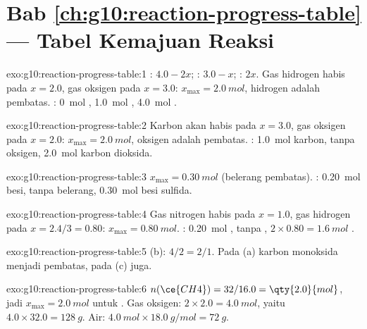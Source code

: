 \section*{Bab \ref{ch:g10:reaction-progress-table} --- Tabel Kemajuan Reaksi}

\begin{solution}{exo:g10:reaction-progress-table:1}
: $4.0 - 2x$; : $3.0 - x$; : $2x$. Gas hidrogen
habis pada $x = 2.0$, gas oksigen pada $x = 3.0$: $x_{\max} = \qty{2.0}{mol}$,
hidrogen adalah pembatas. : \qty{0}{mol} ,
\qty{1.0}{mol} , \qty{4.0}{mol} .
\end{solution}

\begin{solution}{exo:g10:reaction-progress-table:2}
Karbon akan habis pada $x = 3.0$, gas oksigen pada $x = 2.0$:
$x_{\max} = \qty{2.0}{mol}$, oksigen adalah pembatas. :
\qty{1.0}{mol} karbon, tanpa oksigen, \qty{2.0}{mol} karbon dioksida.
\end{solution}

\begin{solution}{exo:g10:reaction-progress-table:3}
$x_{\max} = \qty{0.30}{mol}$ (belerang pembatas). :
\qty{0.20}{mol} besi, tanpa belerang, \qty{0.30}{mol} besi sulfida.
\end{solution}

\begin{solution}{exo:g10:reaction-progress-table:4}
Gas nitrogen habis pada $x = 1.0$, gas hidrogen pada $x = 2.4/3 = 0.80$:
$x_{\max} = \qty{0.80}{mol}$. : \qty{0.20}{mol} ,
tanpa , $2 \times 0.80 = \qty{1.6}{mol}$ .
\end{solution}

\begin{solution}{exo:g10:reaction-progress-table:5}
(b): $4/2 = 2/1$. Pada (a) karbon monoksida menjadi pembatas, pada (c)
juga.
\end{solution}

\begin{solution}{exo:g10:reaction-progress-table:6}
$n(\ce{CH4}) = 32 / 16.0 = \qty{2.0}{mol}$, jadi $x_{\max} = \qty{2.0}{mol}$
untuk . Gas oksigen: $2 \times 2.0 = \qty{4.0}{mol}$,
yaitu $4.0 \times 32.0 = \qty{128}{g}$. Air:
$\qty{4.0}{mol} \times \qty{18.0}{g/mol} = \qty{72}{g}$.
\end{solution}

